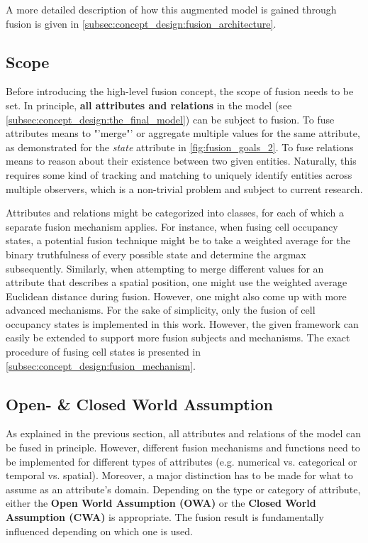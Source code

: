 A more detailed description of how this augmented model is gained through fusion is given in \cref{subsec:concept_design:fusion_architecture}.

\subsection{Scope}
\label{subsec:concept_design:scope}
Before introducing the high-level fusion concept, the scope of fusion needs to be set. In principle, \textbf{all attributes and relations} in the model (see \cref{subsec:concept_design:the_final_model}) can be subject to fusion. To fuse attributes means to "'merge"' or aggregate multiple values for the same attribute, as demonstrated for the \textit{state} attribute in \cref{fig:fusion_goals_2}. To fuse relations means to reason about their existence between two given entities. Naturally, this requires some kind of tracking and matching to uniquely identify entities across multiple observers, which is a non-trivial problem and subject to current research.

Attributes and relations might be categorized into classes, for each of which a separate fusion mechanism applies. For instance, when fusing cell occupancy states, a potential fusion technique might be to take a weighted average for the binary truthfulness of every possible state and determine the argmax subsequently. Similarly, when attempting to merge different values for an attribute that describes a spatial position, one might use the weighted average Euclidean distance during fusion. However, one might also come up with more advanced mechanisms. For the sake of simplicity, only the fusion of cell occupancy states is implemented in this work. However, the given framework can easily be extended to support more fusion subjects and mechanisms. The exact procedure of fusing cell states is presented in \cref{subsec:concept_design:fusion_mechanism}.

\subsection{Open- \& Closed World Assumption}
\label{subsec:concept_design:fusion_open_closed_world_assumption}
As explained in the previous section, all attributes and relations of the model can be fused in principle. However, different fusion mechanisms and functions need to be implemented for different types of attributes (e.g. numerical vs. categorical or temporal vs. spatial). Moreover, a major distinction has to be made for what to assume as an attribute's domain. Depending on the type or category of attribute, either the  \textbf{Open World Assumption (OWA)} or the \textbf{Closed World Assumption (CWA)} is appropriate. The fusion result is fundamentally influenced depending on which one is used.

